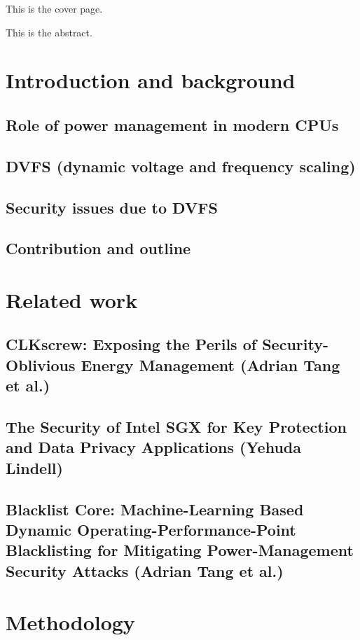 \documentclass[12pt]{article}
\newcommand{\clkscrew}{CLKscrew}
\begin{document}
This is the cover page.

This is the abstract.
\section{Introduction and background}

\subsection{Role of power management in modern CPUs}

\subsection{DVFS (dynamic voltage and frequency scaling)}

\subsection{Security issues due to DVFS}

\subsection{Contribution and outline}

\section{Related work}

\subsection{\clkscrew: Exposing the Perils of Security-Oblivious Energy Management (Adrian Tang et al.)}

\subsection{The Security of Intel SGX for Key Protection and Data Privacy Applications (Yehuda Lindell)}

\subsection{Blacklist Core: Machine-Learning Based Dynamic Operating-Performance-Point Blacklisting for Mitigating Power-Management Security Attacks (Adrian Tang et al.)}

\section{Methodology}
\end{document}
